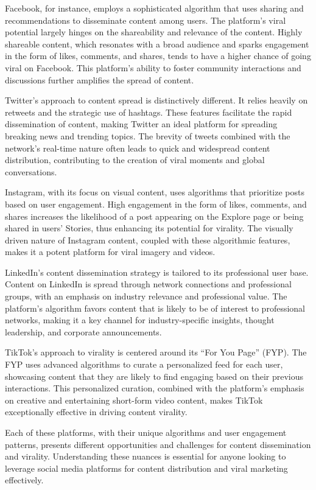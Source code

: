 \documentclass[
]{book}
\begin{document}
Facebook, for instance, employs a sophisticated algorithm that uses sharing and recommendations to disseminate content among users. The platform's viral potential largely hinges on the shareability and relevance of the content. Highly shareable content, which resonates with a broad audience and sparks engagement in the form of likes, comments, and shares, tends to have a higher chance of going viral on Facebook. This platform's ability to foster community interactions and discussions further amplifies the spread of content.

Twitter's approach to content spread is distinctively different. It relies heavily on retweets and the strategic use of hashtags. These features facilitate the rapid dissemination of content, making Twitter an ideal platform for spreading breaking news and trending topics. The brevity of tweets combined with the network's real-time nature often leads to quick and widespread content distribution, contributing to the creation of viral moments and global conversations.

Instagram, with its focus on visual content, uses algorithms that prioritize posts based on user engagement. High engagement in the form of likes, comments, and shares increases the likelihood of a post appearing on the Explore page or being shared in users' Stories, thus enhancing its potential for virality. The visually driven nature of Instagram content, coupled with these algorithmic features, makes it a potent platform for viral imagery and videos.

LinkedIn's content dissemination strategy is tailored to its professional user base. Content on LinkedIn is spread through network connections and professional groups, with an emphasis on industry relevance and professional value. The platform's algorithm favors content that is likely to be of interest to professional networks, making it a key channel for industry-specific insights, thought leadership, and corporate announcements.

TikTok's approach to virality is centered around its ``For You Page'' (FYP). The FYP uses advanced algorithms to curate a personalized feed for each user, showcasing content that they are likely to find engaging based on their previous interactions. This personalized curation, combined with the platform's emphasis on creative and entertaining short-form video content, makes TikTok exceptionally effective in driving content virality.

Each of these platforms, with their unique algorithms and user engagement patterns, presents different opportunities and challenges for content dissemination and virality. Understanding these nuances is essential for anyone looking to leverage social media platforms for content distribution and viral marketing effectively.
\end{document}
